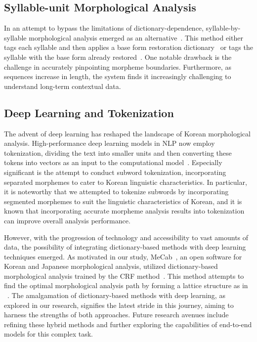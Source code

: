 \documentclass[AMS,STIX2COL]{WileyNJD-v2}
\begin{document}
    \subsection{Syllable-unit Morphological Analysis}\label{subsec2.2}
    In an attempt to bypass the limitations of dictionary-dependence, syllable-by-syllable morphological analysis emerged as an alternative~\cite{ShimKS2011, LeeCK2013, LeeCH2016, KimHM2016, KimSW2018, ChoiYS2018, KimHM2019, MinJW2019, SongHJ2019, SongHJ2020, YounJY2021, ShinHJ2023}. This method either tags each syllable and then applies a base form restoration dictionary~\cite{ShimKS2011, LeeCH2016} or tags the syllable with the base form already restored~\cite{YounJY2021}. One notable drawback is the challenge in accurately pinpointing morpheme boundaries. Furthermore, as sequences increase in length, the system finds it increasingly challenging to understand long-term contextual data.

    \subsection{Deep Learning and Tokenization}\label{subsec2.3}
    The advent of deep learning has reshaped the landscape of Korean morphological analysis. High-performance deep learning models in NLP now employ tokenization, dividing the text into smaller units and then converting these tokens into vectors as an input to the computational model~\cite{Mikolov2013}. Especially significant is the attempt to conduct subword tokenization, incorporating separated morphemes to cater to Korean linguistic characteristics. In particular, it is noteworthy that we attempted to tokenize subwords by incorporating segmented morphemes to suit the linguistic characteristics of Korean, and it is known that incorporating accurate morpheme analysis results into tokenization can improve overall analysis performance.

    However, with the progression of technology and accessibility to vast amounts of data, the possibility of integrating dictionary-based methods with deep learning techniques emerged. As motivated in our study, MeCab~\cite{MeCab}, an open software for Korean and Japanese morphological analysis, utilized dictionary-based morphological analysis trained by the CRF method~\cite{Lafferty2001}. This method attempts to find the optimal morphological analysis path by forming a lattice structure as in ~\cite{Kudo2004, NaSH2014, NaSH2015, NaSH2018}. The amalgamation of dictionary-based methods with deep learning, as explored in our research, signifies the latest stride in this journey, aiming to harness the strengths of both approaches. Future research avenues include refining these hybrid methods and further exploring the capabilities of end-to-end models for this complex task.
\end{document}
